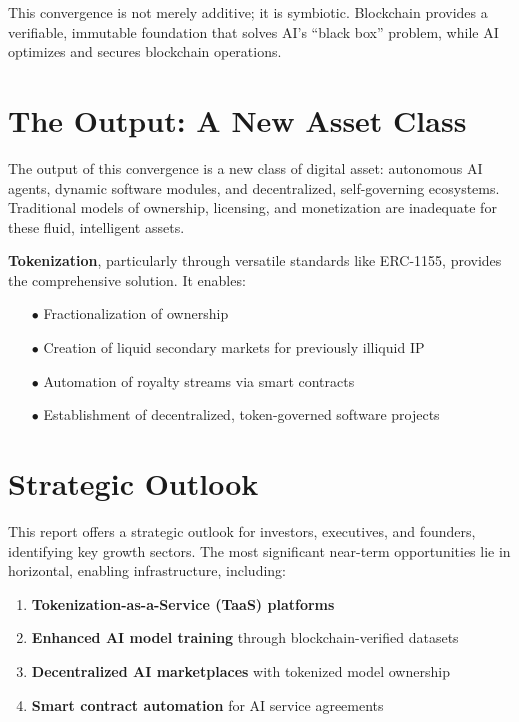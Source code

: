 \documentclass[11pt,a4paper]{report}
\newcommand{\techterm}[1]{\textbf{\textcolor{ocean}{#1}}}
\begin{document}
This convergence is not merely additive; it is symbiotic. Blockchain provides a verifiable, immutable foundation that solves AI's ``black box'' problem, while AI optimizes and secures blockchain operations.

\section*{The Output: A New Asset Class}
The output of this convergence is a new class of digital asset: autonomous AI agents, dynamic software modules, and decentralized, self-governing ecosystems. Traditional models of ownership, licensing, and monetization are inadequate for these fluid, intelligent assets. 

\techterm{Tokenization}, particularly through versatile standards like ERC-1155, provides the comprehensive solution. It enables:

\begin{itemize}[leftmargin=2cm]
    \item[$\bullet$] Fractionalization of ownership
    \item[$\bullet$] Creation of liquid secondary markets for previously illiquid IP
    \item[$\bullet$] Automation of royalty streams via smart contracts
    \item[$\bullet$] Establishment of decentralized, token-governed software projects
\end{itemize}

\section*{Strategic Outlook}

This report offers a strategic outlook for investors, executives, and founders, identifying key growth sectors. The most significant near-term opportunities lie in horizontal, enabling infrastructure, including:

\begin{enumerate}
    \item \textbf{Tokenization-as-a-Service (TaaS) platforms}
    \item \textbf{Enhanced AI model training} through blockchain-verified datasets
    \item \textbf{Decentralized AI marketplaces} with tokenized model ownership
    \item \textbf{Smart contract automation} for AI service agreements
\end{enumerate}
\end{document}
